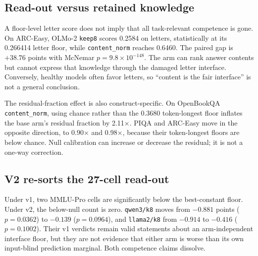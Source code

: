 \subsection{Read-out versus retained knowledge}

A floor-level letter score does not imply that all task-relevant competence is gone. On ARC-Easy, OLMo-2 \texttt{keep8} scores 0.2584 on letters, statistically at its 0.266414 letter floor, while \texttt{content\_norm} reaches 0.6460. The paired gap is $+38.76$ points with McNemar $p=9.8\times10^{-148}$. The arm can rank answer contents but cannot express that knowledge through the damaged letter interface. Conversely, healthy models often favor letters, so ``content is the fair interface'' is not a general conclusion.

The residual-fraction effect is also construct-specific. On OpenBookQA \texttt{content\_norm}, using chance rather than the 0.3680 token-longest floor inflates the base arm's residual fraction by 2.11$\times$. PIQA and ARC-Easy move in the opposite direction, to 0.90$\times$ and 0.98$\times$, because their token-longest floors are below chance. Null calibration can increase or decrease the residual; it is not a one-way correction.

\subsection{V2 re-sorts the 27-cell read-out}

Under v1, two MMLU-Pro cells are significantly below the best-constant floor. Under v2, the below-null count is zero. \texttt{qwen3/k8} moves from $-0.881$ points ($p=0.0362$) to $-0.139$ ($p=0.0964$), and \texttt{llama2/k8} from $-0.914$ to $-0.416$ ($p=0.1002$). Their v1 verdicts remain valid statements about an arm-independent interface floor, but they are not evidence that either arm is worse than its own input-blind prediction marginal. Both competence claims dissolve.

